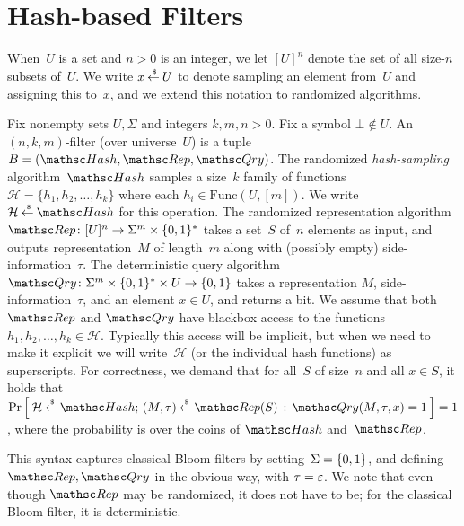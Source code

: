 \section{Hash-based Filters}
When~$U$ is a set and $n>0$ is an integer, we let $[U]^n$ denote the set of all size-$n$ subsets of~$U$. We write $x {\:\stackrel{{\scriptscriptstyle \hspace{0.2em}\$}} {\leftarrow}\:} U$ to denote sampling an element from~$U$ and assigning this to~$x$, and we extend this notation to randomized algorithms.

Fix nonempty sets $U,\Sigma$ and integers $k,m,n>0$.  Fix a symbol $\bot \not\in U$.
An $(n,k,m)$-filter (over universe~$U$) is a tuple $B=(\Hash,\Rep,\Qry)$.
%
The randomized \emph{hash-sampling} algorithm~$\Hash$ samples a
size~$k$ family of functions~$\mathcal{H}=\{h_1,h_2,\ldots,h_k\}$
where each $h_i \in \mathrm{Func}(U,[m])$.  
 We write $\mathcal{H} \getsr \Hash$ for
this operation.
%
The randomized representation algorithm $\Rep\colon [U]^n \rightarrow \Sigma^m \times \bits^*$ takes a set~$S$ of~$n$ elements as input, and outputs representation~$M$ of length~$m$ along with (possibly empty) side-information~$\tau$.
%
The deterministic query algorithm $\Qry\colon \Sigma^m \times \bits^* \times U \rightarrow \bits$ takes a representation $M$, side-information~$\tau$, and an element $x \in U$, and returns a bit.
%
We assume that both $\Rep$ and $\Qry$ have blackbox access to the functions $h_1,h_2,\ldots,h_k \in \mathcal{H}$.  Typically this access will be implicit, but when we need to make it explicit we will write~$\mathcal{H}$ (or the individual hash functions) as superscripts.
%
For correctness, we demand that for all~$S$ of size~$n$ and all $x \in S$, it holds that $\Prob{\mathcal{H}\getsr\Hash;\,(M,\tau)\getsr\Rep(S)\,:\,\Qry(M,\tau,x)=1}=1$, where the probability is over the coins of $\Hash$ and~$\Rep$.


This syntax captures classical Bloom filters by setting~$\Sigma=\{0,1\}$, and defining $\Rep,\Qry$ in the obvious way, with $\tau=\varepsilon$. We note that even though $\Rep$ may be randomized, it does not have to be; for the classical Bloom filter, it is deterministic.

